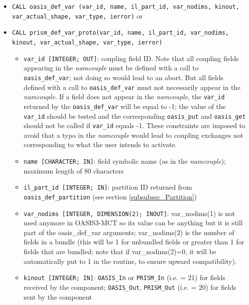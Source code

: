 \begin{itemize}

\item {\tt CALL oasis\_def\_var (var\_id, name, il\_part\_id,
    var\_nodims, kinout, \newline var\_actual\_shape, var\_type,
    ierror)} or

\item {\tt CALL prism\_def\_var\_proto(var\_id, name, il\_part\_id,
    var\_nodims, kinout, var\_actual\_shape, var\_type, ierror)}

  \begin{itemize}
  \item {\tt var\_id [INTEGER; OUT]}: coupling field ID.  Note that all 
      coupling fields appearing in the {\it namcouple} must be defined with 
      a call to {\tt oasis\_def\_var}; not doing so would lead to an abort.  
      But all fields defined with a call to {\tt oasis\_def\_var} must not necessarily 
      appear in the {\it namcouple}. If a field does not appear in the {\it namcouple}, 
      the {\tt var\_id} returned by the {\tt oasis\_def\_var} will be equal to -1; 
      the value of the {\tt var\_id} should be tested and the corresponding 
      {\tt oasis\_put} and {\tt oasis\_get} should not be called if {\tt var\_id} 
      equals -1. These constraints are imposed to avoid that a typo in the {\it namcouple}
       would lead to coupling exchanges not corresponding to what the user intends to activate. 
  \item {\tt name [CHARACTER; IN]}: field symbolic name (as in the
    {\it namcouple}); maximum length of 80 characters
  \item {\tt il\_part\_id [INTEGER; IN]}: partition ID returned from {\tt oasis\_def\_partition} (see section
    \ref{subsubsec_Partition})
  \item {\tt var\_nodims [INTEGER, DIMENSION(2); INOUT]}: var\_nodims(1)
    is not used anymore in OASIS3-MCT so its value can be anything
    but it is still part of the oasis\_def\_var arguments; var\_nodims(2)
    is the number of fields in a bundle (this will be 1 for unbundled
    fields or greater than 1 for fields that are bundled; note that
    if var\_nodims(2)=0, it will be automatically put to 1 in the
    routine, to ensure upward compatibility).
  \item {\tt kinout [INTEGER; IN]}: {\tt OASIS\_In} or {\tt PRISM\_In}
    (i.e. = 21) for fields received by the component; {\tt OASIS\_Out},
    {\tt PRISM\_Out} (i.e. = 20) for fields sent by the component

\end{itemize}
\end{itemize}
